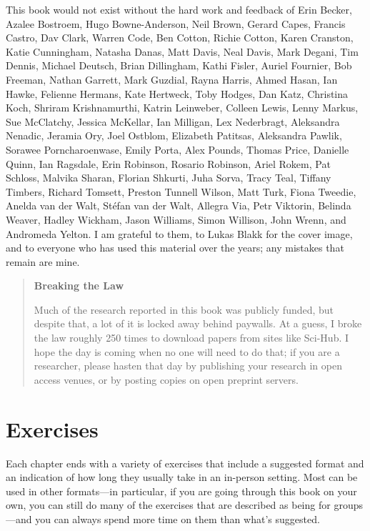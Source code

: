 This book would not exist without the hard work and feedback of
Erin Becker,
Azalee Bostroem,
Hugo Bowne-Anderson,
Neil Brown,
Gerard Capes,
Francis Castro,
Dav Clark,
Warren Code,
Ben Cotton,
Richie Cotton,
Karen Cranston,
Katie Cunningham,
Natasha Danas,
Matt Davis,
Neal Davis,
Mark Degani,
Tim Dennis,
Michael Deutsch,
Brian Dillingham,
Kathi Fisler,
Auriel Fournier,
Bob Freeman,
Nathan Garrett,
Mark Guzdial,
Rayna Harris,
Ahmed Hasan,
Ian Hawke,
Felienne Hermans,
Kate Hertweck,
Toby Hodges,
Dan Katz,
Christina Koch,
Shriram Krishnamurthi,
Katrin Leinweber,
Colleen Lewis,
Lenny Markus,
Sue McClatchy,
Jessica McKellar,
Ian Milligan,
Lex Nederbragt,
Aleksandra Nenadic,
Jeramia Ory,
Joel Ostblom,
Elizabeth Patitsas,
Aleksandra Pawlik,
Sorawee Porncharoenwase,
Emily Porta,
Alex Pounds,
Thomas Price,
Danielle Quinn,
Ian Ragsdale,
Erin Robinson,
Rosario Robinson,
Ariel Rokem,
Pat Schloss,
Malvika Sharan,
Florian Shkurti,
Juha Sorva,
Tracy Teal,
Tiffany Timbers,
Richard Tomsett,
Preston Tunnell Wilson,
Matt Turk,
Fiona Tweedie,
Anelda van der Walt,
St\'{e}fan van der Walt,
Allegra Via,
Petr Viktorin,
Belinda Weaver,
Hadley Wickham,
Jason Williams,
Simon Willison,
John Wrenn,
and Andromeda Yelton.
I am grateful to them, to Lukas Blakk for the cover image, and to
everyone who has used this material over the years; any mistakes that
remain are mine.

\begin{quote}\setlength{\parindent}{0pt}
\textbf{Breaking the Law}

Much of the research reported in this book was publicly funded, but
despite that, a lot of it is locked away behind paywalls. At a guess,
I broke the law roughly 250 times to download papers from sites like
Sci-Hub. I hope the day is coming when no one will need to do that; if
you are a researcher, please hasten that day by publishing your
research in open access venues, or by posting copies on open preprint
servers.
\end{quote}

\section{Exercises}\label{s:intro-exercises}

Each chapter ends with a variety of exercises that include a suggested
format and an indication of how long they usually take in an in-person
setting. Most can be used in other formats---in particular, if you are
going through this book on your own, you can still do many of the
exercises that are described as being for groups---and you can always
spend more time on them than what's suggested.

